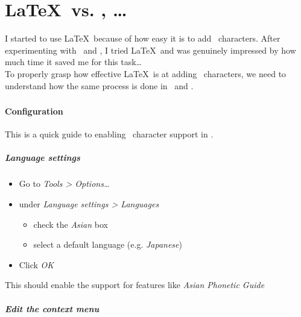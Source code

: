 
\part{\LaTeX\ vs. \LibreOffice, \Word\dots} \label{msword}

\renewcommand{\currentPart}{\LaTeX\ vs. \LibreOffice, \Word\dots}

I started to use \LaTeX\ because of how easy it is to add \rruby\ characters. 
After experimenting with \LibreOffice\ and \Word, I tried \LaTeX\ and was genuinely impressed by how much time it saved me for this task\dots \\

To properly grasp how effective \LaTeX\ is at adding \rruby\ characters, we need to understand how the same process is done in \LibreOffice\ and \Word.


\section*{\LibreOffice}

\subsection*{Configuration}

This is a quick guide to enabling \rruby\ character support in \LibreOffice.

\subsubsection*{Language settings}

\begin{itemize}
	\item Go to \emph{Tools > Options\dots}
	\item under \emph{Language settings > Languages}
	\begin{itemize}
		\item check the \emph{Asian} box
		\item select a default language (e.g. \emph{Japanese})
	\end{itemize}
	\item Click \emph{OK}
\end{itemize}

This should enable the support for features like \emph{Asian Phonetic Guide}

\subsubsection*{Edit the context menu}

